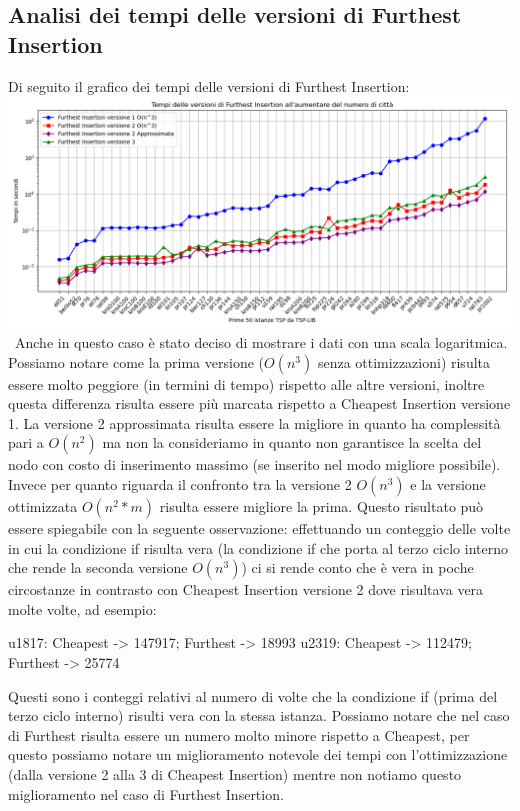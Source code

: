 \documentclass[a4paper,12pt]{report}
\begin{document}
\subsection{Analisi dei tempi delle versioni di Furthest Insertion}
Di seguito il grafico dei tempi delle versioni di Furthest Insertion: \newline
\includegraphics[width=1\textwidth]{../Grafici/5.png} \
Anche in questo caso è stato deciso di mostrare i dati con una scala logaritmica. Possiamo notare come la prima versione ($O(n^3)$ senza ottimizzazioni) risulta essere molto peggiore (in termini di tempo) rispetto alle altre versioni, inoltre questa differenza risulta essere più marcata rispetto a Cheapest Insertion versione 1. La versione 2 approssimata risulta essere la migliore in quanto ha complessità pari a $O(n^2)$ ma non la consideriamo in quanto non garantisce la scelta del nodo con costo di inserimento massimo (se inserito nel modo migliore possibile). Invece per quanto riguarda il confronto tra la versione 2 $O(n^3)$ e la versione ottimizzata $O(n^2 * m)$ risulta essere migliore la prima. Questo risultato può essere spiegabile con la seguente osservazione: effettuando un conteggio delle volte in cui la condizione if risulta vera (la condizione if che porta al terzo ciclo interno che rende la seconda versione $O(n^3)$) ci si rende conto che è vera in poche circostanze in contrasto con Cheapest Insertion versione 2 dove risultava vera molte volte, ad esempio:
\begin{myverbatim}
u1817: Cheapest -> 147917; Furthest -> 18993
u2319: Cheapest -> 112479; Furthest -> 25774
\end{myverbatim}
Questi sono i conteggi relativi al numero di volte che la condizione if (prima del terzo ciclo interno) risulti vera con la stessa istanza. Possiamo notare che nel caso di Furthest risulta essere un numero molto minore rispetto a Cheapest, per questo possiamo notare un miglioramento notevole dei tempi con l'ottimizzazione (dalla versione 2 alla 3 di Cheapest Insertion) mentre non notiamo questo miglioramento nel caso di Furthest Insertion.
\end{document}
